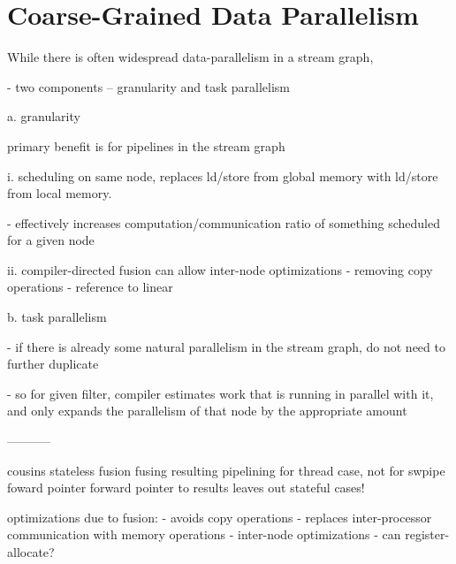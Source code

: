 \begin{figure}[t]
\end{figure}

\begin{figure}[t]
\end{figure}

\section{Coarse-Grained Data Parallelism}

While there is often widespread data-parallelism in a stream graph, 

- two components -- granularity and task parallelism

a. granularity

primary benefit is for pipelines in the stream graph

i. scheduling on same node, replaces ld/store from global memory with
ld/store from local memory.

  - effectively increases computation/communication ratio of something
    scheduled for a given node

ii. compiler-directed fusion can allow inter-node optimizations
  - removing copy operations
  - reference to linear

b. task parallelism

 - if there is already some natural parallelism in the stream graph,
   do not need to further duplicate

 - so for given filter, compiler estimates work that is running in
   parallel with it, and only expands the parallelism of that node by
   the appropriate amount

-----------

  cousins
  stateless fusion
  fusing resulting pipelining for thread case, not for swpipe foward pointer
  forward pointer to results 
  leaves out stateful cases!

optimizations due to fusion:
 - avoids copy operations 
 - replaces inter-processor communication with memory operations
 - inter-node optimizations
 - can register-allocate?
